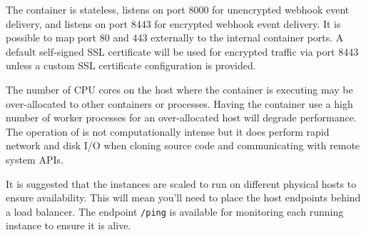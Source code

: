 The \cxoneflow container is stateless, listens on port 8000 for unencrypted webhook event delivery, 
and listens on port 8443 for encrypted webhook event delivery.  It is possible to map port 80 and 443
externally to the internal container ports.  A default self-signed SSL certificate will be used
for encrypted traffic via port 8443 unless a custom SSL certificate configuration is provided.  

The number of CPU cores on the host where the container is executing may be over-allocated to other
containers or processes.  Having the container use a high number of worker processes for an over-allocated
host will degrade performance.  The operation of \cxoneflow is not computationally intense
but it does perform rapid network and disk I/O when cloning source code and communicating with
remote system APIs.

It is suggested that the \cxoneflow instances are scaled to run on different physical hosts to
ensure availability.  This will mean you'll need to place the \cxoneflow host endpoints behind 
a load balancer.  The \cxoneflow endpoint \texttt{/ping} is available for monitoring each
running instance to ensure it is alive.



